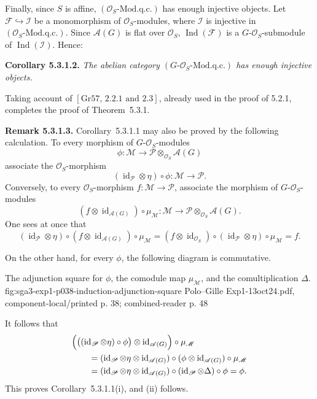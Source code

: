 Finally, since \(S\) is affine,
\((\mathscr O_S\text{-Mod.q.c.})\) has enough injective objects. Let
\(\mathscr F\hookrightarrow\mathscr I\) be a monomorphism of
\(\mathscr O_S\)-modules, where \(\mathscr I\) is injective in
\((\mathscr O_S\text{-Mod.q.c.})\). Since \(\mathscr A(G)\) is flat over
\(\mathscr O_S\), \(\operatorname{Ind}(\mathscr F)\) is a
\(G\)-\(\mathscr O_S\)-submodule of \(\operatorname{Ind}(\mathscr I)\).
Hence:

\medskip
\noindent\textbf{Corollary 5.3.1.2.}
\textit{The abelian category \((G\text{-}\mathscr O_S\text{-Mod.q.c.})\)
has enough injective objects.}

Taking account of \([\mathrm{Gr}57,\,2.2.1\text{ and }2.3]\), already used
in the proof of 5.2.1, completes the proof of Theorem~5.3.1.

\medskip
\noindent\textbf{Remark 5.3.1.3.}
Corollary~5.3.1.1 may also be proved by the following calculation. To every
morphism of \(G\)-\(\mathscr O_S\)-modules
\[
  \phi:\mathscr M\longrightarrow
    \mathscr P\otimes_{\mathscr O_S}\mathscr A(G)
\]
associate the \(\mathscr O_S\)-morphism
\[
  (\operatorname{id}_{\mathscr P}\otimes\eta)\circ\phi:
    \mathscr M\longrightarrow\mathscr P.
\]
Conversely, to every \(\mathscr O_S\)-morphism
\(f:\mathscr M\to\mathscr P\), associate the morphism of
\(G\)-\(\mathscr O_S\)-modules
\[
  (f\otimes\operatorname{id}_{\mathscr A(G)})\circ\mu_{\mathscr M}:
    \mathscr M\longrightarrow
    \mathscr P\otimes_{\mathscr O_S}\mathscr A(G).
\]
One sees at once that
\[
  (\operatorname{id}_{\mathscr P}\otimes\eta)
    \circ(f\otimes\operatorname{id}_{\mathscr A(G)})
    \circ\mu_{\mathscr M}
  =(f\otimes\operatorname{id}_{\mathscr O_S})
    \circ(\operatorname{id}_{\mathscr P}\otimes\eta)
    \circ\mu_{\mathscr M}
  =f.
\]

On the other hand, for every \(\phi\), the following diagram is
commutative.

  {The adjunction square for \(\phi\), the comodule map
   \(\mu_{\mathscr M}\), and the comultiplication \(\Delta\).}
  {fig:sga3-exp1-p038-induction-adjunction-square}
  {Polo--Gille Exp1-13oct24.pdf, component-local/printed p. 38;
   combined-reader p. 48}

It follows that
\begin{align*}
 &\Bigl(
    \bigl((\operatorname{id}_{\mathscr P}\otimes\eta)\circ\phi\bigr)
      \otimes\operatorname{id}_{\mathscr A(G)}
  \Bigr)\circ\mu_{\mathscr M}\\
 &\qquad=
  (\operatorname{id}_{\mathscr P}\otimes\eta
     \otimes\operatorname{id}_{\mathscr A(G)})
  \circ(\phi\otimes\operatorname{id}_{\mathscr A(G)})
  \circ\mu_{\mathscr M}\\
 &\qquad=
  (\operatorname{id}_{\mathscr P}\otimes\eta
     \otimes\operatorname{id}_{\mathscr A(G)})
  \circ(\operatorname{id}_{\mathscr P}\otimes\Delta)
  \circ\phi
  =\phi.
\end{align*}
This proves Corollary~5.3.1.1(i), and (ii) follows.

